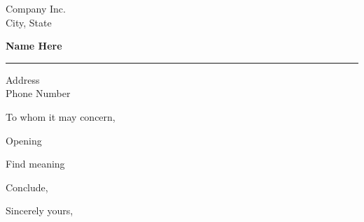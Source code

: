 \documentclass{letter} %
\begin{document}
\signature{%
Name Here}           %
\longindentation=0pt                       %
\let\raggedleft\raggedright                %
 
 
\begin{letter}{Company Inc. \\
City, State}


\begin{flushleft}
{\large\bf Name Here}
\end{flushleft}
\medskip\hrule height 1pt
\begin{flushright}
\hfill Address \\
\hfill Phone Number
\end{flushright} 
\vfill %

 
\opening{To whom it may concern,} 
 
\noindent Opening   
 
\noindent Find meaning  
 
\noindent Conclude, 
 
\closing{Sincerely yours,} 

 
\end{letter}
 
\end{document}
